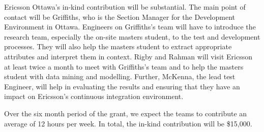 \documentclass[12pt, letterpaper]{article}
\begin{document}
\fancyhead{}
\pagestyle{fancy}
\renewcommand{\headrulewidth}{0pt}

\begin{center}
\begin{LARGE}
\noindent
{}
\end{LARGE}
\end{center}


Ericsson Ottawa's in-kind contribution will be substantial. The main point of
contact will be Griffiths, who is the Section Manager for the Development
Environment in Ottawa. Engineers on Griffiths's team will have to introduce the
research team, especially the on-site masters student, to the test and
development processes. They will also help the masters student to extract
appropriate attributes and interpret them in context.  Rigby and Rahman will
visit Ericsson at least twice a month to meet with Griffiths's team and to help
the masters student with data mining and modelling. Further, McKenna, the lead
test Engineer, will help in evaluating the results and ensuring that they have
an impact on Ericsson's continuous integration environment. 

Over the six month period of the grant, we expect the teams to contribute an
average of 12 hours per week. 
In total, the in-kind contribution will be \$15,000.
\end{document}
